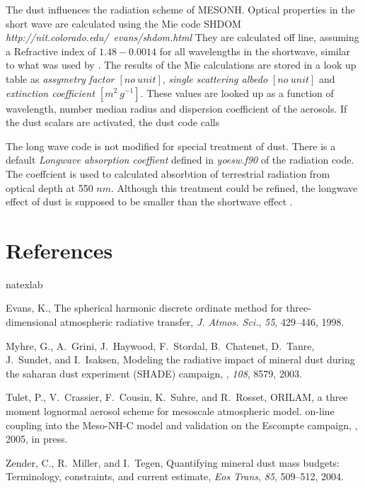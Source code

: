 The dust influences the radiation scheme of MESONH. Optical properties in the short wave
are calculated using the Mie code SHDOM \cite{evans98} {\it http://nit.colorado.edu/~evans/shdom.html}
They are calculated off line, assuming a Refractive index of $1.48 -0.0014$ for all 
wavelengths in the shortwave, similar to what was used by \cite{myhre03}. The results of the
Mie calculations are stored in a look up table as {\it assymetry factor $[no~unit]$}, 
{\it single scattering albedo $[no~unit]$} and {\it extinction coefficient $[m^2~g^{-1}]$}.
These values are looked up as a function of wavelength, number median radius and dispersion coefficient
of the aerosols. If the dust scalars are activated, the dust code calls 

The long wave code is not modified for special treatment of dust. There is a default {\it Longwave
absorption coeffient} defined in {\it yoesw.f90} of the radiation code. The coeffcient is used
to calculated absorbtion of terrestrial radiation from optical depth at 550 ${nm}$. Although
this treatment could be refined, the longwave effect of dust is supposed to be smaller than the
shortwave effect \cite[]{myhre03}. 



%
\section{References}
\expandafter\ifx\csname natexlab\endcsname\relax\def\natexlab#1{#1}\fi

Evans, K., The spherical harmonic discrete ordinate method for
  three-dimensional atmospheric radiative transfer, {\it J. Atmos. Sci.\/},
  {\it 55\/}, 429--446, 1998.

Myhre, G., A.~Grini, J.~Haywood, F.~Stordal, B.~Chatenet, D.~Tanre, J.~Sundet,
  and I.~Isaksen, Modeling the radiative impact of mineral dust during the
  saharan dust experiment ({SHADE}) campaign, {\it \jgr\/}, {\it 108\/}, 8579,
  2003.

Tulet, P., V.~Crassier, F.~Cousin, K.~Suhre, and R.~Rosset, {ORILAM}, a three
  moment lognormal aerosol scheme for mesoscale atmospheric model. on-line
  coupling into the {Meso-NH-C} model and validation on the {Escompte}
  campaign, {\it \jgr\/}, 2005, in press.

Zender, C., R.~Miller, and I.~Tegen, Quantifying mineral dust mass budgets:
  Terminology, constraints, and current estimate, {\it {Eos Trans}\/}, {\it
  85\/}, 509--512, 2004.

